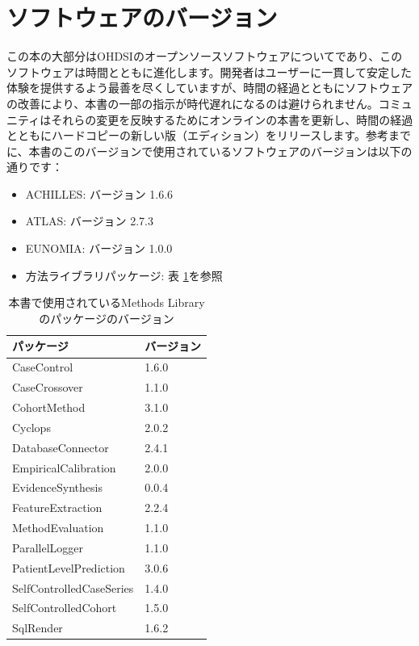 \documentclass[
  11pt]{book}
\providecommand{\tightlist}{%
  \setlength{\itemsep}{0pt}\setlength{\parskip}{0pt}}
\theoremstyle{definition}
\theoremstyle{definition}
\theoremstyle{definition}
\theoremstyle{definition}
\theoremstyle{remark}
\begin{document}
\section*{ソフトウェアのバージョン}\label{ux30bdux30d5ux30c8ux30a6ux30a7ux30a2ux306eux30d0ux30fcux30b8ux30e7ux30f3}

この本の大部分はOHDSIのオープンソースソフトウェアについてであり、このソフトウェアは時間とともに進化します。開発者はユーザーに一貫して安定した体験を提供するよう最善を尽くしていますが、時間の経過とともにソフトウェアの改善により、本書の一部の指示が時代遅れになるのは避けられません。コミュニティはそれらの変更を反映するためにオンラインの本書を更新し、時間の経過とともにハードコピーの新しい版（エディション）をリリースします。参考までに、本書のこのバージョンで使用されているソフトウェアのバージョンは以下の通りです：

\begin{itemize}
\tightlist
\item
  ACHILLES: バージョン 1.6.6
\item
  ATLAS: バージョン 2.7.3
\item
  EUNOMIA: バージョン 1.0.0
\item
  方法ライブラリパッケージ: 表 \ref{tab:packageVersions}を参照
\end{itemize}

\begin{table}

\caption{\label{tab:packageVersions}本書で使用されているMethods Libraryのパッケージのバージョン}
\centering
\begin{tabular}[t]{ll}
\toprule
パッケージ & バージョン\\
\midrule
CaseControl & 1.6.0\\
CaseCrossover & 1.1.0\\
CohortMethod & 3.1.0\\
Cyclops & 2.0.2\\
DatabaseConnector & 2.4.1\\
\addlinespace
EmpiricalCalibration & 2.0.0\\
EvidenceSynthesis & 0.0.4\\
FeatureExtraction & 2.2.4\\
MethodEvaluation & 1.1.0\\
ParallelLogger & 1.1.0\\
\addlinespace
PatientLevelPrediction & 3.0.6\\
SelfControlledCaseSeries & 1.4.0\\
SelfControlledCohort & 1.5.0\\
SqlRender & 1.6.2\\
\bottomrule
\end{tabular}
\end{table}
\end{document}
